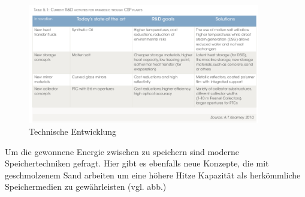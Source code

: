 \begin{figure}[H]
	\centering
	\includegraphics[width=0.9\textwidth]{technische_entwicklung2.png}
	\caption{Technische Entwicklung}
	\label{fig:technik_e2}
\end{figure}

\newline
Um die gewonnene Energie zwischen zu speichern sind moderne Speichertechniken gefragt. Hier gibt es ebenfalls neue Konzepte, die mit geschmolzenem Sand arbeiten um eine höhere Hitze Kapazität als herkömmliche Speichermedien zu gewährleisten (vgl. abb.)


